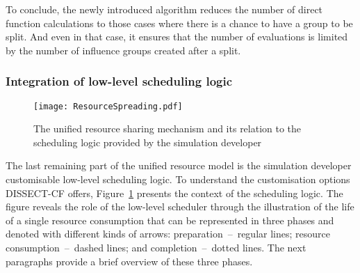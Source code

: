 \documentclass[sort, compress, 5p]{elsarticle}
\begin{document}
To conclude, the newly introduced algorithm reduces the number of direct  function calculations to those cases where there is a chance to have a group to be split. And even in that case, it ensures that the number of  evaluations is limited by the number of influence groups created after a split.

\subsubsection{Integration of low-level scheduling logic}

\begin{figure}[tb]
\centering
\texttt{[image: ResourceSpreading.pdf]}
\caption{The unified resource sharing mechanism and its relation to the scheduling logic provided by the simulation developer\label{FIG-RS}}
\end{figure}

The last remaining part of the unified resource model is the simulation developer customisable low-level scheduling logic. To understand the customisation options DISSECT-CF offers, Figure~\ref{FIG-RS} presents the context of the scheduling logic. The figure reveals the role of the low-level scheduler through the illustration of the life of a single resource consumption that can be represented in three phases and denoted with different kinds of arrows: preparation~--~regular lines; resource consumption~--~dashed lines; and completion~--~dotted lines. The next paragraphs provide a brief overview of these three phases.
\end{document}
